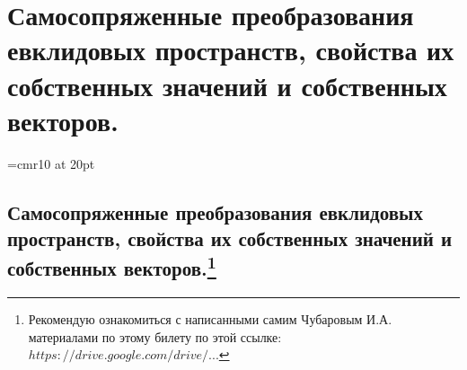 \chapter{Самосопряженные преобразования евклидовых пространств, свойства их собственных значений и собственных векторов.}

\font\Large=cmr10 at 20pt
\def\fudge#1{\smash{\hbox{\Large#1}}}

\section[Самосопряженные преобразования евклидовых пространств, свойства их собственных значений и собственных векторов.]{Самосопряженные преобразования евклидовых пространств, свойства их собственных значений и собственных векторов.\footnote{Рекомендую ознакомиться с написанными самим Чубаровым И.А. материалами по этому билету по этой ссылке: \href{https://drive.google.com/drive/u/0/folders/0BzuzEyNkpwYDcFhhV1l2N1lhY2s}{$https://drive.google.com/drive/...$}}}

